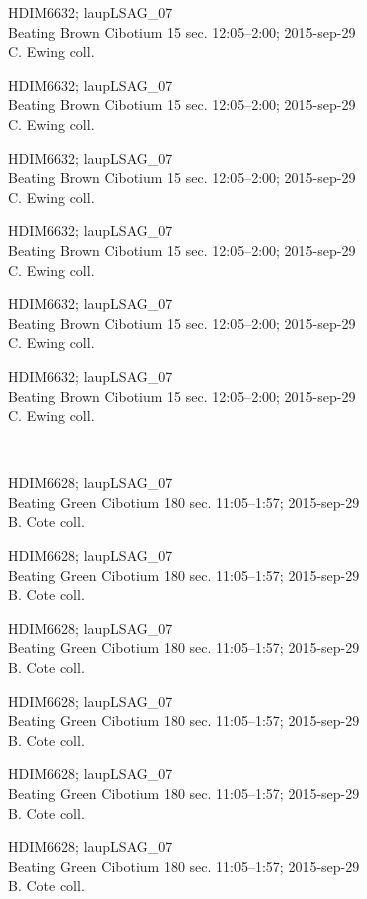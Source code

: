 \documentclass[2pt]{extarticle}
\begin{document}
\noindent
\parbox{0.16\textwidth}{\tiny \raggedright \rule[-0.3\baselineskip]{0pt}{10pt}HDIM6632; laupLSAG\_07\\ Beating Brown Cibotium 15 sec. 12:05--2:00; 2015-sep-29\\ C. Ewing coll.}
\parbox{0.16\textwidth}{\tiny \raggedright \rule[-0.3\baselineskip]{0pt}{10pt}HDIM6632; laupLSAG\_07\\ Beating Brown Cibotium 15 sec. 12:05--2:00; 2015-sep-29\\ C. Ewing coll.}
\parbox{0.16\textwidth}{\tiny \raggedright \rule[-0.3\baselineskip]{0pt}{10pt}HDIM6632; laupLSAG\_07\\ Beating Brown Cibotium 15 sec. 12:05--2:00; 2015-sep-29\\ C. Ewing coll.}
\parbox{0.16\textwidth}{\tiny \raggedright \rule[-0.3\baselineskip]{0pt}{10pt}HDIM6632; laupLSAG\_07\\ Beating Brown Cibotium 15 sec. 12:05--2:00; 2015-sep-29\\ C. Ewing coll.}
\parbox{0.16\textwidth}{\tiny \raggedright \rule[-0.3\baselineskip]{0pt}{10pt}HDIM6632; laupLSAG\_07\\ Beating Brown Cibotium 15 sec. 12:05--2:00; 2015-sep-29\\ C. Ewing coll.}
\parbox{0.16\textwidth}{\tiny \raggedright \rule[-0.3\baselineskip]{0pt}{10pt}HDIM6632; laupLSAG\_07\\ Beating Brown Cibotium 15 sec. 12:05--2:00; 2015-sep-29\\ C. Ewing coll.} \\ 
\vspace{0.001in} 

\noindent
\parbox{0.16\textwidth}{\tiny \raggedright \rule[-0.3\baselineskip]{0pt}{10pt}HDIM6628; laupLSAG\_07\\ Beating Green Cibotium 180 sec. 11:05--1:57; 2015-sep-29\\ B. Cote coll.}
\parbox{0.16\textwidth}{\tiny \raggedright \rule[-0.3\baselineskip]{0pt}{10pt}HDIM6628; laupLSAG\_07\\ Beating Green Cibotium 180 sec. 11:05--1:57; 2015-sep-29\\ B. Cote coll.}
\parbox{0.16\textwidth}{\tiny \raggedright \rule[-0.3\baselineskip]{0pt}{10pt}HDIM6628; laupLSAG\_07\\ Beating Green Cibotium 180 sec. 11:05--1:57; 2015-sep-29\\ B. Cote coll.}
\parbox{0.16\textwidth}{\tiny \raggedright \rule[-0.3\baselineskip]{0pt}{10pt}HDIM6628; laupLSAG\_07\\ Beating Green Cibotium 180 sec. 11:05--1:57; 2015-sep-29\\ B. Cote coll.}
\parbox{0.16\textwidth}{\tiny \raggedright \rule[-0.3\baselineskip]{0pt}{10pt}HDIM6628; laupLSAG\_07\\ Beating Green Cibotium 180 sec. 11:05--1:57; 2015-sep-29\\ B. Cote coll.}
\parbox{0.16\textwidth}{\tiny \raggedright \rule[-0.3\baselineskip]{0pt}{10pt}HDIM6628; laupLSAG\_07\\ Beating Green Cibotium 180 sec. 11:05--1:57; 2015-sep-29\\ B. Cote coll.} \\ 
\vspace{0.001in} 
\end{document}
